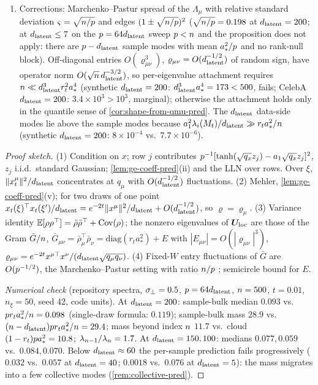 \begin{proposition}[sketched]
\begin{enumerate}
\item Corrections: Marchenko--Pastur spread of the $\Lambda_\mu$ with relative standard deviation $\varsigma=\sqrt{n/p}$ and edges $(1\pm\sqrt{n/p})^2$ ($\sqrt{n/p}=0.198$ at $d_{\mathrm{latent}}=200$; at $d_{\mathrm{latent}}\le7$ on the $p=64d_{\mathrm{latent}}$ sweep $p<n$ and the proposition does not apply: there are $p-d_{\mathrm{latent}}$ sample modes with mean $a_*^2/p$ and no rank-null block). Off-diagonal entries $O(\varrho_{\mu\nu}^3)$, $\varrho_{\mu\nu}=O(d_{\mathrm{latent}}^{-1/2})$ of random sign, have operator norm $O(\sqrt{n}\,d_{\mathrm{latent}}^{-3/2})$, so per-eigenvalue attachment requires $n\ll d_{\mathrm{latent}}^3r_t^2a_*^4$ (synthetic $d_{\mathrm{latent}}=200$: $d_{\mathrm{latent}}^3a_*^4=173<500$, fails; CelebA $d_{\mathrm{latent}}=200$: $3.4\times10^3>10^3$, marginal); otherwise the attachment holds only in the quantile sense of \cref{cor:shape-from-qmu-pred}. The $d_{\mathrm{latent}}$ data-side modes lie above the sample modes because $a_1^2\lambda_i(M_t)/d_{\mathrm{latent}}\gg r_ta_*^2/n$ (synthetic $d_{\mathrm{latent}}=200$: $8\times10^{-4}$ vs.\ $7.7\times10^{-6}$).
\end{enumerate}
\end{proposition}
\begin{proof}[Proof sketch]
(1) Condition on $x$; row $j$ contributes $p^{-1}[\tanh(\sqrt{q_x}z_j)-a_1\sqrt{q_x}z_j]^2$, $z_j$ i.i.d.\ standard Gaussian; \cref{lem:ge-coeff-pred}(ii) and the LLN over rows. Over $\xi$, $\|x_t^\mu\|^2/d_{\mathrm{latent}}$ concentrates at $q_\mu$ with $O(d_{\mathrm{latent}}^{-1/2})$ fluctuations. (2) Mehler, \cref{lem:ge-coeff-pred}(v); for two draws of one point $x_t(\xi)^\top x_t(\xi')/d_{\mathrm{latent}}=e^{-2t}\|x^\mu\|^2/d_{\mathrm{latent}}+O(d_{\mathrm{latent}}^{-1/2})$, so $\varrho=\varrho_\mu$. (3) Variance identity $\mathbb{E}[\rho\rho^\top]=\bar\rho\bar\rho^\top+\mathrm{Cov}(\rho)$; the nonzero eigenvalues of $\bm{U}_{\rm loc}$ are those of the Gram $\bar G/n$, $\bar G_{\mu\nu}=\bar\rho_\mu^\top\bar\rho_\nu=\mathrm{diag}(r_ta_*^2)+E$ with $|E_{\mu\nu}|=O(|\varrho_{\mu\nu}|^3)$, $\varrho_{\mu\nu}=e^{-2t}x^{\mu\top}x^\nu/(d_{\mathrm{latent}}\sqrt{q_\mu q_\nu})$. (4) Fixed-$W$ entry fluctuations of $\bar G$ are $O(p^{-1/2})$, the Marchenko--Pastur setting with ratio $n/p$ \citep{marchenko1967distribution}; semicircle bound for $E$.

\emph{Numerical check} (repository spectra, $\sigma_{\perp}=0.5$, $p=64d_{\mathrm{latent}}$, $n=500$, $t=0.01$, $n_\xi=50$, seed 42, code units). At $d_{\mathrm{latent}}=200$: sample-bulk median $0.093$ vs.\ $p r_ta_*^2/n=0.098$ (single-draw formula: $0.119$); sample-bulk mass $28.9$ vs.\ $(n-d_{\mathrm{latent}})p r_ta_*^2/n=29.4$; mass beyond index $n$ $11.7$ vs.\ cloud $(1-r_t)p a_*^2=10.8$; $\lambda_{n-1}/\lambda_{n}=1.7$. At $d_{\mathrm{latent}}=150,100$: medians $0.077,0.059$ vs.\ $0.084,0.070$. Below $d_{\mathrm{latent}}\approx60$ the per-sample prediction fails progressively ($0.032$ vs.\ $0.057$ at $d_{\mathrm{latent}}=40$; $0.0018$ vs.\ $0.076$ at $d_{\mathrm{latent}}=5$): the mass migrates into a few collective modes (\cref{rem:collective-pred}).
\end{proof}

